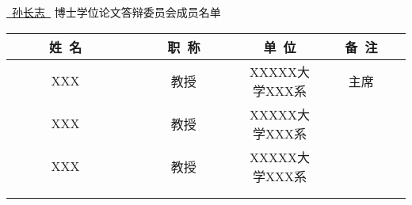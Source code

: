 \newpage
\thispagestyle{empty}
\vspace*{2em}

\begin{center}\STSong{}
 \underline{\ 孙长志\ } 博士学位论文答辩委员会成员名单
\end{center}

\begin{center}
\renewcommand{\arraystretch}{1.4}
  \begin{tabular}{|c|c|c|c|} \hline
   ~~~~~姓~名~~~~~ & ~~~~~职~称~~~~~ 
   & \hspace{6em}单~位\hspace{6em} & ~~~备~注~~~\\\hline
         XXX    &   教授    &  XXXXX大学XXX系  & 主席  \\ \hline
         XXX    &   教授    &  XXXXX大学XXX系  &       \\ \hline
         XXX    &   教授    &  XXXXX大学XXX系  &       \\ \hline
                &           &                   &       \\ \hline
                &           &                   &       \\ \hline
  \end{tabular}
\end{center}

